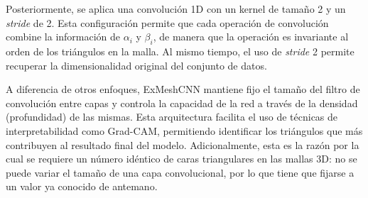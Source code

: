 Posteriormente, se aplica una convolución 1D con un kernel de tamaño 2 y un \textit{stride} de 2. Esta configuración permite que cada operación de convolución combine la información de $\alpha_i$ y $\beta_i$, de manera que la operación es invariante al orden de los triángulos en la malla. Al mismo tiempo, el uso de \textit{stride} 2 permite recuperar la dimensionalidad original del conjunto de datos.

A diferencia de otros enfoques, ExMeshCNN mantiene fijo el tamaño del filtro de convolución entre capas y controla la capacidad de la red a través de la densidad (profundidad) de las mismas. Esta arquitectura facilita el uso de técnicas de interpretabilidad como Grad-CAM, permitiendo identificar los triángulos que más contribuyen al resultado final del modelo. Adicionalmente, esta es la razón por la cual se requiere un número idéntico de caras triangulares en las mallas 3D: no se puede variar el tamaño de una capa convolucional, por lo que tiene que fijarse a un valor ya conocido de antemano.